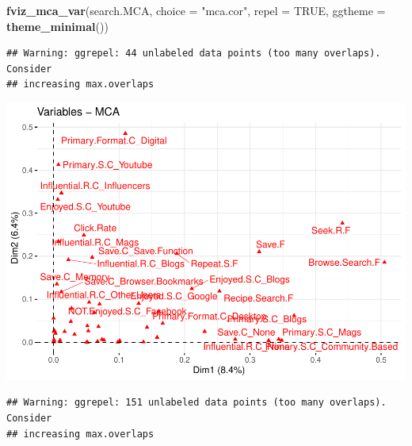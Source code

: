 \documentclass[
]{article}
\newenvironment{Shaded}{\begin{snugshade}}{\end{snugshade}}
\newcommand{\DataTypeTok}[1]{\textcolor[rgb]{0.13,0.29,0.53}{#1}}
\newcommand{\KeywordTok}[1]{\textcolor[rgb]{0.13,0.29,0.53}{\textbf{#1}}}
\newcommand{\NormalTok}[1]{#1}
\newcommand{\OtherTok}[1]{\textcolor[rgb]{0.56,0.35,0.01}{#1}}
\newcommand{\StringTok}[1]{\textcolor[rgb]{0.31,0.60,0.02}{#1}}
\begin{document}
\begin{Shaded}
\begin{Highlighting}[]
\KeywordTok{fviz_mca_var}\NormalTok{(search.MCA, }\DataTypeTok{choice =} \StringTok{"mca.cor"}\NormalTok{, }\DataTypeTok{repel =} \OtherTok{TRUE}\NormalTok{,}
             \DataTypeTok{ggtheme =} \KeywordTok{theme_minimal}\NormalTok{())}
\end{Highlighting}
\end{Shaded}

\begin{verbatim}
## Warning: ggrepel: 44 unlabeled data points (too many overlaps). Consider
## increasing max.overlaps
\end{verbatim}

\includegraphics{Average-User-MCA_files/figure-latex/mca searching all-2.pdf}

\begin{Shaded}
\end{Shaded}

\begin{verbatim}
## Warning: ggrepel: 151 unlabeled data points (too many overlaps). Consider
## increasing max.overlaps
\end{verbatim}
\end{document}
